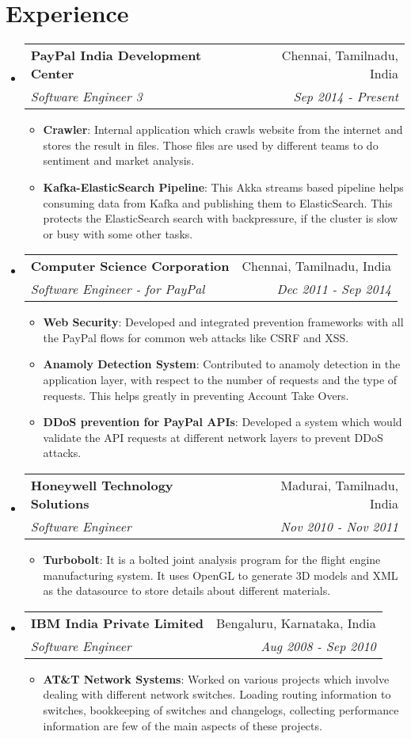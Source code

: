 \documentclass[letterpaper,11pt]{article}
\makeatletter
\newcommand{\resumeItem}[2]{
  \item\small{
    \textbf{#1}{: #2 \vspace{-2pt}}
  }
}
\newcommand{\resumeSubheading}[4]{
  \vspace{-1pt}\item
    \begin{tabular*}{0.97\textwidth}{l@{\extracolsep{\fill}}r}
      \textbf{#1} & #2 \\
      \textit{\small#3} & \textit{\small #4} \\
    \end{tabular*}\vspace{-5pt}
}
\newcommand{\resumeSubHeadingListStart}{\begin{itemize}[leftmargin=*]}
\newcommand{\resumeSubHeadingListEnd}{\end{itemize}}
\newcommand{\resumeItemListStart}{\begin{itemize}}
\newcommand{\resumeItemListEnd}{\end{itemize}\vspace{-5pt}}
\makeatother
\begin{document}
\section{Experience}
  \resumeSubHeadingListStart

    \resumeSubheading
      {PayPal India Development Center}{Chennai, Tamilnadu, India}
      {Software Engineer 3}{Sep 2014 - Present}
      \resumeItemListStart
        \resumeItem{Crawler}
          {Internal application which crawls website from the internet and stores the result in files. Those files are used by different teams to do sentiment and market analysis.}
        \resumeItem{Kafka-ElasticSearch Pipeline}
          {This Akka streams based pipeline helps consuming data from Kafka and publishing them to ElasticSearch. This protects the ElasticSearch search with backpressure, if the cluster is slow or busy with some other tasks.}
      \resumeItemListEnd

    \resumeSubheading
      {Computer Science Corporation}{Chennai, Tamilnadu, India}
      {Software Engineer - for PayPal}{Dec 2011 - Sep 2014}
      \resumeItemListStart
        \resumeItem{Web Security}
          {Developed and integrated prevention frameworks with all the PayPal flows for common web attacks like CSRF and XSS.}
        \resumeItem{Anamoly Detection System}
          {Contributed to anamoly detection in the application layer, with respect to the number of requests and the type of requests. This helps greatly in preventing Account Take Overs.}
        \resumeItem{DDoS prevention for PayPal APIs}
          {Developed a system which would validate the API requests at different network layers to prevent DDoS attacks.}
      \resumeItemListEnd

    \resumeSubheading
      {Honeywell Technology Solutions}{Madurai, Tamilnadu, India}
      {Software Engineer}{Nov 2010 - Nov 2011}
      \resumeItemListStart
        \resumeItem{Turbobolt}
          {It is a bolted joint analysis program for the flight engine manufacturing system. It uses OpenGL to generate 3D models and XML as the datasource to store details about different materials.}
      \resumeItemListEnd

    \resumeSubheading
      {IBM India Private Limited}{Bengaluru, Karnataka, India}
      {Software Engineer}{Aug 2008 - Sep 2010}
      \resumeItemListStart
        \resumeItem{AT\&T Network Systems}
          {Worked on various projects which involve dealing with different network switches. Loading routing information to switches, bookkeeping of switches and changelogs, collecting performance information are few of the main aspects of these projects.}
      \resumeItemListEnd

  \resumeSubHeadingListEnd

\end{document}

